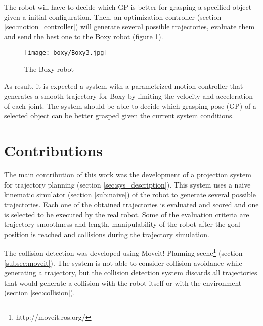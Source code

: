 The robot will have to decide which GP is better for grasping a specified object given a initial configuration. Then, an optimization controller (section \ref{sec:motion_controller}) will generate several possible trajectories, evaluate them and send the best one to the Boxy robot (figure \ref{fig:boxy}).

\begin{figure}[H]
	\centering
	\texttt{[image: boxy/Boxy3.jpg]}
	\vspace{-10pt}
	\caption{The Boxy robot}
	\vspace{-15pt}
	\label{fig:boxy}
\end{figure}

As result, it is expected a system with a parametrized motion controller that generates a smooth trajectory for Boxy by limiting the velocity and acceleration of each joint. The system should be able to decide which grasping pose (GP) of a selected object can be better grasped given the current system conditions.


\section{Contributions}

The main contribution of this work was the development of a projection system for trajectory planning (section \ref{sec:sys_description}). This system uses a naive kinematic simulator (section \ref{sub:naive}) of the robot to generate several possible trajectories. Each one of the obtained trajectories is evaluated and scored and one is selected to be executed by the real robot. Some of the evaluation criteria are trajectory smoothness and length, manipulability of the robot after the goal position is reached and collisions during the trajectory simulation.

The collision detection was developed using Moveit! Planning scene\footnote{http://moveit.ros.org/} (section \ref{subsec:moveit}). The system is not able to consider collision avoidance while generating a trajectory, but the collision detection system discards all trajectories that would generate a collision with the robot itself or with the environment (section \ref{sec:collision}).

